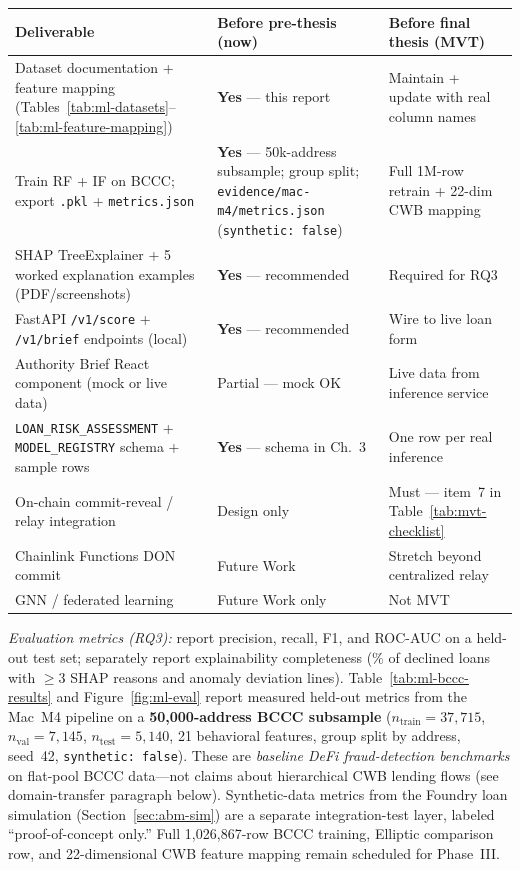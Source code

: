 \documentclass[12pt,a4paper]{report}
\newcommand{\tableheadcolor}{\rowcolor{TableHeadBg}}
\begin{document}
\begin{table}[H]
\centering
\begin{tabular}{p{5.2cm}p{3.8cm}p{4.2cm}}
\toprule
\tableheadcolor
\textbf{Deliverable} & \textbf{Before pre-thesis (now)} & \textbf{Before final thesis (MVT)} \\
\midrule
Dataset documentation + feature mapping (Tables~\ref{tab:ml-datasets}--\ref{tab:ml-feature-mapping}) & \textbf{Yes} --- this report & Maintain + update with real column names \\
Train RF + IF on BCCC; export \texttt{.pkl} + \texttt{metrics.json} & \textbf{Yes} --- 50k-address subsample; group split; \texttt{evidence/mac-m4/metrics.json} (\texttt{synthetic: false}) & Full 1M-row retrain + 22-dim CWB mapping \\
SHAP TreeExplainer + 5 worked explanation examples (PDF/screenshots) & \textbf{Yes} --- recommended & Required for RQ3 \\
FastAPI \texttt{/v1/score} + \texttt{/v1/brief} endpoints (local) & \textbf{Yes} --- recommended & Wire to live loan form \\
Authority Brief React component (mock or live data) & Partial --- mock OK & Live data from inference service \\
\texttt{LOAN\_RISK\_ASSESSMENT} + \texttt{MODEL\_REGISTRY} schema + sample rows & \textbf{Yes} --- schema in Ch.~3 & One row per real inference \\
On-chain commit-reveal / relay integration & Design only & Must --- item~7 in Table~\ref{tab:mvt-checklist} \\
Chainlink Functions DON commit & Future Work & Stretch beyond centralized relay \\
GNN / federated learning & Future Work only & Not MVT \\
\bottomrule
\end{tabular}
\end{table}

\noindent\textit{Evaluation metrics (RQ3):} report precision, recall, F1, and ROC-AUC on a held-out test set; separately report explainability completeness (\% of declined loans with $\geq$3 SHAP reasons and anomaly deviation lines). Table~\ref{tab:ml-bccc-results} and Figure~\ref{fig:ml-eval} report measured held-out metrics from the Mac~M4 pipeline on a \textbf{50{,}000-address BCCC subsample} ($n_{\text{train}}{=}37{,}715$, $n_{\text{val}}{=}7{,}145$, $n_{\text{test}}{=}5{,}140$, 21 behavioral features, group split by address, seed~42, \texttt{synthetic: false}). These are \textit{baseline DeFi fraud-detection benchmarks} on flat-pool BCCC data---not claims about hierarchical CWB lending flows (see domain-transfer paragraph below). Synthetic-data metrics from the Foundry loan simulation (Section~\ref{sec:abm-sim}) are a separate integration-test layer, labeled ``proof-of-concept only.'' Full 1{,}026{,}867-row BCCC training, Elliptic comparison row, and 22-dimensional CWB feature mapping remain scheduled for Phase~III.
\end{document}
